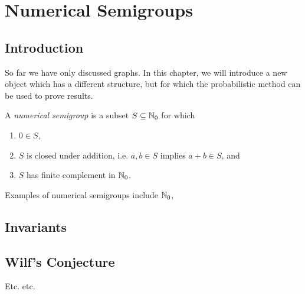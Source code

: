 \chapter{Numerical Semigroups}\label{chap:probmet}

\section{Introduction}\label{sec:smgps:intro}

So far we have only discussed graphs. In this chapter, we will introduce a new object which has a different structure, but for which the probabilistic method can be used to prove results. \par

\begin{definition} \cite{rosales2009numerical}
    A \textit{numerical semigroup} is a subset $S \subseteq \mathbb{N}_{0}$ for which 
    \begin{enumerate}
        \item $0 \in S$,
        \item $S$ is closed under addition, i.e. $a, b \in S$ implies $a + b \in S$, and
        \item $S$ has finite complement in $\mathbb{N}_{0}$.
    \end{enumerate}
\end{definition}

Examples of numerical semigroups include $\mathbb{N}_{0}$, 

\section{Invariants}\label{sec:smgps:theme1}

\begin{definition}[Multiplicity]
    
\end{definition}



\begin{definition}
\end{definition}

\begin{definition}
\end{definition}

\begin{definition}

\end{definition}


\begin{definition}[Genus]

\end{definition}

\section{Wilf's Conjecture}\label{sec:smgps:theme2}

Etc. etc.
